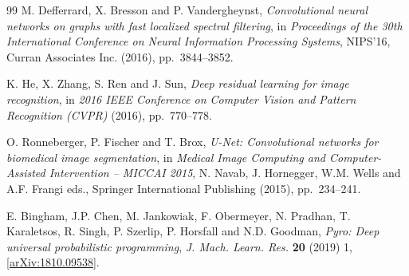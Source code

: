 \documentclass[a4paper,11pt]{article}
\begin{document}
\begin{thebibliography}{99}
M. Defferrard, X. Bresson and P. Vandergheynst,
\emph{Convolutional neural networks on graphs with fast localized spectral filtering},
in \emph{Proceedings of the 30th International Conference on Neural Information Processing Systems}, NIPS'16, Curran Associates Inc. (2016), pp.~3844--3852.

K. He, X. Zhang, S. Ren and J. Sun,
\emph{Deep residual learning for image recognition},
in \emph{2016 IEEE Conference on Computer Vision and Pattern Recognition (CVPR)} (2016), pp.~770--778.

O. Ronneberger, P. Fischer and T. Brox,
\emph{U-Net: Convolutional networks for biomedical image segmentation},
in \emph{Medical Image Computing and Computer-Assisted Intervention -- MICCAI 2015}, N. Navab, J. Hornegger, W.M. Wells and A.F. Frangi eds., Springer International Publishing (2015), pp.~234--241.

E. Bingham, J.P. Chen, M. Jankowiak, F. Obermeyer, N. Pradhan, T. Karaletsos, R. Singh, P. Szerlip, P. Horsfall and N.D. Goodman,
\emph{Pyro: Deep universal probabilistic programming},
\emph{J. Mach. Learn. Res.} {\bf 20} (2019) 1,
[\href{https://arxiv.org/abs/1810.09538}{arXiv:1810.09538}].

\end{thebibliography}



\end{document}
